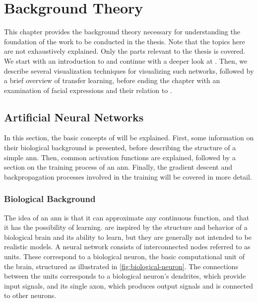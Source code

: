 
\chapter{Background Theory}

This chapter provides the background theory necessary for understanding the foundation of the work to be conducted in the thesis. Note that the topics here are not exhaustively explained. Only the parts relevant to the thesis is covered. We start with an introduction to  and continue with a deeper look at . Then, we describe several visualization techniques for visualizing such networks, followed by a brief overview of transfer learning, before ending the chapter with an examination of facial expressions and their relation to .

\section{Artificial Neural Networks}

In this section, the basic concepts of  will be explained. First, some information on their biological background is presented, before describing the structure of a simple \acrshort{ann}. Then, common activation functions are explained, followed by a section on the training process of an \acrshort{ann}. Finally, the gradient descent and backpropagation processes involved in the training will be covered in more detail.

\subsection{Biological Background}

The idea of an \acrshort{ann} is that it can approximate any continuous function, and that it has the possibility of learning.  are inspired by the structure and behavior of a biological brain and its ability to learn, but they are generally not intended to be realistic models. A neural network consists of interconnected nodes referred to as units. These correspond to a biological neuron, the basic computational unit of the brain, structured as illustrated in \autoref{fig:biological-neuron}. The connections between the units corresponds to a biological neuron's dendrites, which provide input signals, and its single axon, which produces output signals and is connected to other neurons. \\

